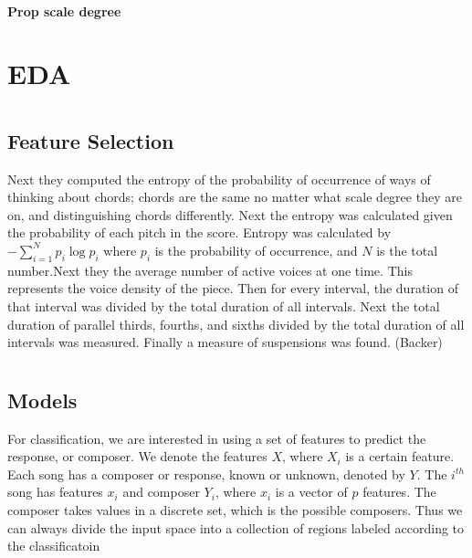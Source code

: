 \documentclass[12pt,twoside]{reedthesis}
\theoremstyle{definition}
\theoremstyle{definition}
\theoremstyle{definition}
\theoremstyle{remark}
\begin{document}
\subsubsection{Prop scale degree}\label{prop-scale-degree}

\chapter{EDA}\label{eda}

\chapter{}\label{section-2}

\section{Feature Selection}\label{feature-selection-1}

Next they computed the entropy of the probability of occurrence of ways
of thinking about chords; chords are the same no matter what scale
degree they are on, and distinguishing chords differently. Next the
entropy was calculated given the probability of each pitch in the score.
Entropy was calculated by \(-\sum_{i = 1}^{N}p_i\log{p_i}\) where
\(p_i\) is the probability of occurrence, and \(N\) is the total
number.Next they the average number of active voices at one time. This
represents the voice density of the piece. Then for every interval, the
duration of that interval was divided by the total duration of all
intervals. Next the total duration of parallel thirds, fourths, and
sixths divided by the total duration of all intervals was measured.
Finally a measure of suspensions was found. (Backer)

\chapter{}\label{section-3}

\section{Models}\label{models}

For classification, we are interested in using a set of features to
predict the response, or composer. We denote the features \(X\), where
\(X_i\) is a certain feature. Each song has a composer or response,
known or unknown, denoted by \(Y\). The \(i^{th}\) song has features
\(x_i\) and composer \(Y_i\), where \(x_i\) is a vector of \(p\)
features. The composer takes values in a discrete set, which is the
possible composers. Thus we can always divide the input space into a
collection of regions labeled according to the classificatoin
\end{document}
